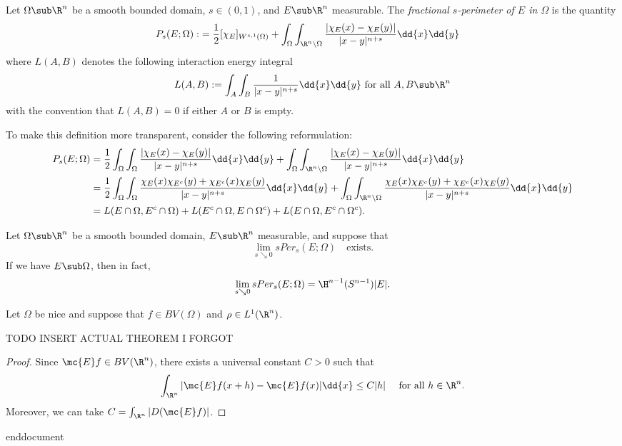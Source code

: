 \documentclass[../main.tex]{subfiles}
\begin{document}
\begin{definition}
    Let $ \Omega\sub \R^{n} $ be a smooth bounded domain, $ s\in (0,1) $, and $ E\sub \R^{n} $ measurable. The \textit{fractional $ s $-perimeter of $ E $ in $ \Omega $} is the quantity
    \begin{align*}
        P_{s}(E; \Omega) :&= \frac{1}{2}[\chi_{E}]_{W^{s,1}(\Omega)} + \int_{\Omega}\int_{\R^{n}\setminus \Omega} \frac{| \chi_{E}(x) - \chi_{E}(y)|}{|x-y|^{n+s}}\dd{x}\dd{y} 
    \end{align*}
    where $ L(A,B) $ denotes the following interaction energy integral
    \[
        L(A,B) := \int_{A}\int_{B}\frac{1}{|x-y|^{n+s}}\dd{x}\dd{y} \text{ for all } A,B\sub \R^{n}
    \]
    with the convention that $ L(A,B) = 0 $ if either $ A $ or $ B $ is empty.
\end{definition}
To make this definition more transparent, consider the following reformulation:
\begin{align*}
    P_{s}(E; \Omega) &= \frac{1}{2}\int_{\Omega}\int_{\Omega} \frac{|\chi_{E}(x)-\chi_{E}(y)|}{|x-y|^{n+s}}\dd{x}\dd{y} +  \int_{\Omega}\int_{\R^{n}\setminus \Omega} \frac{| \chi_{E}(x) - \chi_{E}(y)|}{|x-y|^{n+s}}\dd{x}\dd{y} \\
    &= \frac{1}{2}\int_{\Omega}\int_{\Omega} \frac{\chi_{E}(x) \chi_{E^{c}}(y) + \chi_{E^{c}}(x) \chi_{E}(y)}{|x-y|^{n+s}}\dd{x}\dd{y} +  \int_{\Omega}\int_{\R^{n}\setminus \Omega} \frac{\chi_{E}(x) \chi_{E^{c}}(y) + \chi_{E^{c}}(x) \chi_{E}(y)}{|x-y|^{n+s}}\dd{x}\dd{y}\\
    &= L(E\cap \Omega, E^{c} \cap \Omega) + L(E^{c}\cap \Omega, E\cap \Omega^{c}) + L(E\cap \Omega, E^{c}\cap \Omega^{c}).
\end{align*}


\begin{theorem}
    Let $ \Omega\sub \R^{n} $ be a smooth bounded domain, $ E\sub \R^{n} $ measurable, and suppose that
    \[
        \lim_{s\searrow 0} s Per_{s}(E ; \Omega) \quad\text{exists.}
    \]
    If we have $ E\sub \Omega $, then in fact, 
    \[
        \lim_{s\searrow 0} s Per_{s}(E ; \Omega) = \H^{n-1}(S^{n-1}) |E| .
    \]
\end{theorem}

\begin{proposition}
    Let $ \Omega $ be nice and suppose that $ f\in BV(\Omega) $ and $ \rho\in L^{1}(\R^{n}) $.


    TODO INSERT ACTUAL THEOREM I FORGOT
\end{proposition}

\begin{proof}
    Since $ \mc{E}f\in BV(\R^{n}) $, there exists a universal constant $ C>0 $ such that 
    \[
        \int_{\R^{n}} |\mc{E}f(x+h) - \mc{E}f(x)|\dd{x} \leq C|h| \quad \text{ for all } h\in \R^{n}.
    \]
    Moreover, we can take $ C = \int_{\R^{n}} |D(\mc{E}f)| $.


\end{proof}



end{document}
\end{document}
